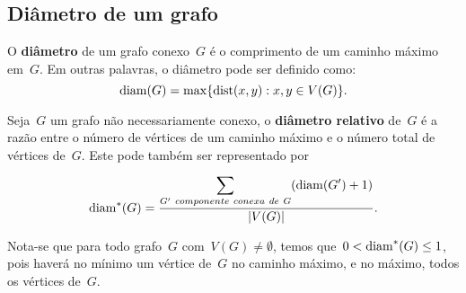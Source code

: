 	\bigskip
	\bigskip


	\subsection{Diâmetro de um grafo}
	\label{subsec:diametro}
	O \textbf{diâmetro} de um grafo conexo~$G$ é o
	comprimento de um caminho máximo em~$G$. 
	Em outras palavras, o diâmetro pode ser definido como:
	$$ \mathrm{diam}(G)=\max\{\mathrm{dist}(x,y):x,y\in V(G)\}.$$

	\bigskip

	Seja~$G$ um grafo não necessariamente conexo,
	o \textbf{diâmetro relativo} de~$G$
	 é a razão entre o número
	de vértices de um caminho máximo e o número total de vértices
	de~$G$. Este pode também ser representado por
	$$ \mathrm{diam}^*(G) =\dfrac{\displaystyle\sum_{
	G'~componente~conexa~de~G}^{}(\mathrm{diam}(G')+1)}{|V(G)|}.$$

	\medskip

	Nota-se que para todo grafo~$G$ com~${V(G)\ne \emptyset}$, temos
	que~${0<\mathrm{diam}^*(G)\le 1}$, pois haverá no mínimo um vértice 
	de~$G$ no caminho máximo, e no máximo, todos os vértices 
	de~$G$.